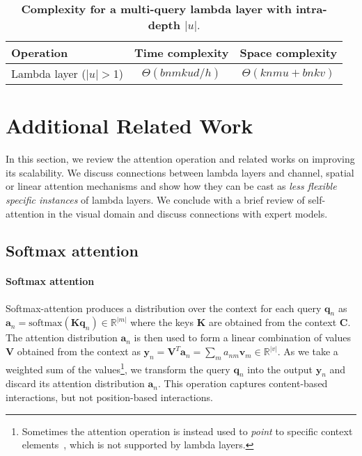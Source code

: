 \documentclass{article} \usepackage{iclr2021_conference,times}
\begin{document}
\begin{table}[h]
  \begin{center}
  \small
  \begin{tabular}{l|cc}
    \toprule
    Operation & Time complexity & Space complexity \\
    \midrule
    Lambda layer ($|u|>$1) & $\Theta(bnmkud/h)$ & $\Theta(knmu + bnkv)$ \\
    \bottomrule
  \end{tabular}
  \caption{\textbf{Complexity for a multi-query lambda layer with intra-depth $|u|$}.}
  \label{tab:complexity_u}
  \end{center}
\end{table}
 \newpage
\section{Additional Related Work\label{sec:additional_related_work}}
In this section, we review the attention operation and related works on improving its scalability.
We discuss connections between lambda layers and channel, spatial or linear attention mechanisms and show how they can be cast as \emph{less flexible specific instances} of lambda layers.
We conclude with a brief review of self-attention in the visual domain and discuss connections with expert models.

\vspace{-0.1cm}
\subsection{Softmax attention}
\paragraph{Softmax attention}
Softmax-attention produces a distribution over the context for each query $\boldsymbol{q}_n$ as $\boldsymbol{a}_n = \textrm{softmax}(\boldsymbol{K} \boldsymbol{q}_n) \in \mathbb{R}^{|m|}$ where the keys $\boldsymbol{K}$ are obtained from the context $\boldsymbol{C}$.
The attention distribution $\boldsymbol{a}_n$ is then used to form a linear combination of values $\boldsymbol{V}$ obtained from the context as $\boldsymbol{y}_n = \boldsymbol{V}^T \boldsymbol{a}_n = \sum_m a_{nm}\boldsymbol{v}_m \in \mathbb{R}^{|v|}$.
As we take a weighted sum of the values\footnote{
Sometimes the attention operation is instead used to \emph{point} to specific context elements~\citep{vinyals2015pointer,bello2016nco}, which is not supported by lambda layers.}, we transform the query $\boldsymbol{q}_n$ into the output $\boldsymbol{y}_n$ and discard its attention distribution $\boldsymbol{a}_n$.
This operation captures content-based interactions, but not position-based interactions.
\end{document}
